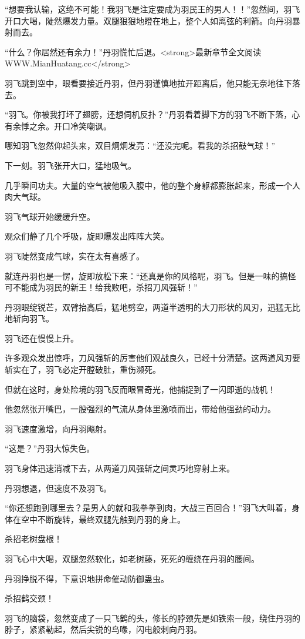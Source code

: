 \begin{this_body}
“想要我认输，这绝不可能！我羽飞是注定要成为羽民王的男人！！”忽然间，羽飞开口大喝，陡然爆发力量。双腿狠狠地瞪在地上，整个人如离弦的利箭。向丹羽暴射而去。

“什么？你居然还有余力！”丹羽慌忙后退。<strong>最新章节全文阅读WWW.MianHuatang.cc</strong>

羽飞跳到空中，眼看要接近丹羽，但丹羽谨慎地拉开距离后，他只能无奈地往下落去。

“羽飞。你被我打坏了翅膀，还想伺机反扑？”丹羽看着脚下方的羽飞不断下落，心有余悸之余。开口冷笑嘲讽。

哪知羽飞忽然仰起头来，双目炯炯发亮：“还没完呢。看我的杀招鼓气球！”

下一刻。羽飞张开大口，猛地吸气。

几乎瞬间功夫。大量的空气被他吸入腹中，他的整个身躯都膨胀起来，形成一个人肉大气球。

羽飞气球开始缓缓升空。

观众们静了几个呼吸，旋即爆发出阵阵大笑。

羽飞陡然变成气球，实在太有喜感了。

就连丹羽也是一愣，旋即放松下来：“还真是你的风格呢，羽飞。但是一味的搞怪可不能成为羽民的新王！给我败吧，杀招刀风强斩！”

丹羽眼绽锐芒，双臂抬高后，猛地劈空，两道半透明的大刀形状的风刃，迅猛无比地斩向羽飞。

羽飞还在慢慢上升。

许多观众发出惊呼，刀风强斩的厉害他们观战良久，已经十分清楚。这两道风刃要斩实在了，羽飞必定开膛破肚，重伤濒死。

但就在这时，身处险境的羽飞反而眼冒奇光，他捕捉到了一闪即逝的战机！

他忽然张开嘴巴，一股强烈的气流从身体里激喷而出，带给他强劲的动力。

羽飞速度激增，向丹羽飚射。

“这是？”丹羽大惊失色。

羽飞身体迅速消减下去，从两道刀风强斩之间灵巧地穿射上来。

丹羽想退，但速度不及羽飞。

“你还想跑到哪里去？是男人的就和我拳拳到肉，大战三百回合！”羽飞大叫着，身体在空中不断旋转，最终双腿先触到丹羽的身上。

杀招老树盘根！

羽飞心中大喝，双腿忽然软化，如老树藤，死死的缠绕在丹羽的腰间。

丹羽挣脱不得，下意识地拼命催动防御蛊虫。

杀招鹤交颈！

羽飞的脑袋，忽然变成了一只飞鹤的头，修长的脖颈先是如铁索一般，绕住丹羽的脖子，紧紧勒起，然后尖锐的鸟喙，闪电般刺向丹羽。


\end{this_body}

